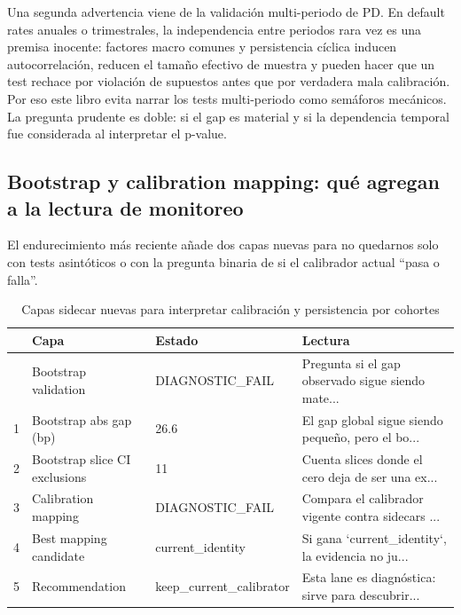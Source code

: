 \documentclass[
  spanish,
  11pt,
  letterpaper,
]{scrbook}
\theoremstyle{plain}
\theoremstyle{remark}
\begin{document}
Una segunda advertencia viene de la validación multi-periodo de PD. En
default rates anuales o trimestrales, la independencia entre periodos
rara vez es una premisa inocente: factores macro comunes y persistencia
cíclica inducen autocorrelación, reducen el tamaño efectivo de muestra y
pueden hacer que un test rechace por violación de supuestos antes que
por verdadera mala calibración. Por eso este libro evita narrar los
tests multi-periodo como semáforos mecánicos. La pregunta prudente es
doble: si el gap es material y si la dependencia temporal fue
considerada al interpretar el p-value.

\subsection{Bootstrap y calibration mapping: qué agregan a la lectura de
monitoreo}\label{bootstrap-y-calibration-mapping-quuxe9-agregan-a-la-lectura-de-monitoreo}

El endurecimiento más reciente añade dos capas nuevas para no quedarnos
solo con tests asintóticos o con la pregunta binaria de si el calibrador
actual ``pasa o falla''.

{

\begin{longtable}[]{@{}llll@{}}

\caption{\label{tbl-bootstrap-calibration-sidecars}Capas sidecar nuevas
para interpretar calibración y persistencia por cohortes}

\tabularnewline

\toprule\noalign{}
& Capa & Estado & Lectura \\
\midrule\noalign{}
\endhead
\bottomrule\noalign{}
\endlastfoot
0 & Bootstrap validation & DIAGNOSTIC\_FAIL & Pregunta si el gap
observado sigue siendo mate... \\
1 & Bootstrap abs gap (bp) & 26.6 & El gap global sigue siendo pequeño,
pero el bo... \\
2 & Bootstrap slice CI exclusions & 11 & Cuenta slices donde el cero
deja de ser una ex... \\
3 & Calibration mapping & DIAGNOSTIC\_FAIL & Compara el calibrador
vigente contra sidecars ... \\
4 & Best mapping candidate & current\_identity & Si gana
`current\_identity`, la evidencia no ju... \\
5 & Recommendation & keep\_current\_calibrator & Esta lane es
diagnóstica: sirve para descubrir... \\

\end{longtable}

}
\end{document}
